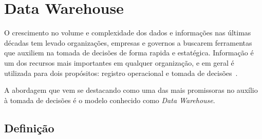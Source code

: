\chapter{Data Warehouse}

O crescimento no volume e complexidade dos dados e informações nas últimas décadas tem levado organizações, empresas e governos a buscarem ferramentas que auxiliem na tomada de decisões de forma rapida e estatégica. Informação é um dos recursos mais importantes em qualquer organização, e em geral é utilizada para dois propósitos: registro operacional e tomada de decisões~\cite{dwkimball}. 

A abordagem que vem se destacando como uma das mais promissoras no auxílio à tomada de decisões é o modelo conhecido como \emph{Data Warehouse}.

\section{Definição}

